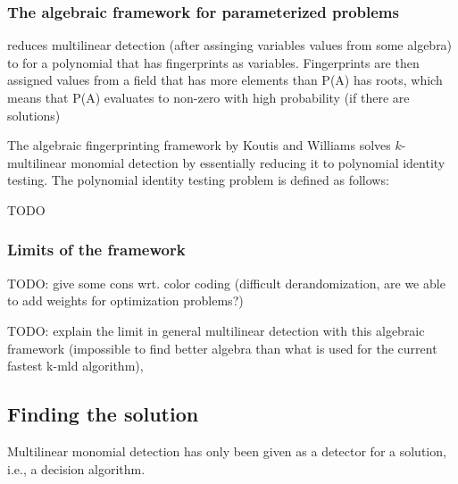 \subsubsection{The algebraic framework for parameterized problems}

\cite{Williams09} reduces multilinear detection (after assinging variables values from some algebra) 
to
for a polynomial
 that has fingerprints as variables. 
Fingerprints are then assigned values from a field that has more elements than P(A) has roots, which 
means that P(A) evaluates to non-zero with high probability (if there are solutions)

The algebraic fingerprinting framework by Koutis and Williams  
solves $k$-multilinear monomial detection by essentially reducing it to 
polynomial identity testing. The polynomial identity testing problem is defined 
as follows:

\begin{problem}
\end{problem}


TODO

\subsubsection{Limits of the framework}
\label{sect:limits}

TODO: give some cons wrt. color coding (difficult derandomization, 
are we able to add weights for optimization problems?) %

TODO: explain the limit in general multilinear detection with this algebraic framework 
(impossible to find better algebra than what is used for the current fastest k-mld algorithm), \cite{KouWil09}

\subsection{Finding the solution}

Multilinear monomial detection has only been given as a detector for a solution,
i.e., a decision algorithm. 

